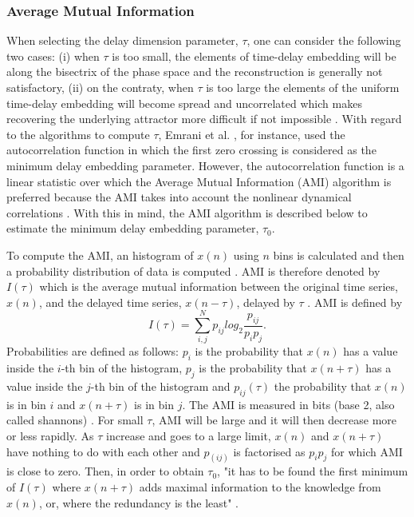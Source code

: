 \documentclass[fleqn,10pt]{wlscirep}
\begin{document}
\subsubsection*{Average Mutual Information}
When selecting the delay dimension parameter, $\tau$, one can consider the 
following two cases:
(i) when $\tau$ is too small, the elements of time-delay embedding will be along
the bisectrix of the phase space and the reconstruction is generally not 
satisfactory, 
(ii) on the contraty, when $\tau$ is too large the elements of the uniform 
time-delay embedding will become spread and uncorrelated which makes 
recovering the underlying attractor more difficult if not 
impossible \cite{casdagli1991, emrani2014a, garcia2005e71}.
With regard to the algorithms to compute $\tau$, 
Emrani et al. \cite{emrani2014a}, for instance, used the autocorrelation 
function in which the first zero crossing is considered as the minimum delay 
embedding parameter. However, the autocorrelation function is a linear 
statistic over which the Average Mutual Information (AMI) algorithm is 
preferred because the AMI takes into account the nonlinear dynamical 
correlations \cite{afraser1986,krakovska2015}. With this in mind, the AMI 
algorithm is described below to estimate the minimum delay embedding 
parameter, \texorpdfstring{$\tau_0$}{T}.

To compute the AMI, an histogram of $x(n)$ using $n$ bins is calculated
and then a probability distribution of data is computed \cite{kantz2003}.
AMI is therefore denoted by $I(\tau)$ which is the average mutual 
information between the original time series, $x(n)$, and the delayed 
time series, $x(n-\tau)$, delayed by $\tau$ \cite{kabiraj2012}. 
AMI is defined by
\begin{equation}\label{eq:ami}
I(\tau) = \sum_{i,j}^N p_{ij} log_2 \frac{ p_{ij} }{ p_i p_j }.
\end{equation}
Probabilities are defined as follows:
$p_i$ is the probability that $x(n)$ has a value inside the $i$-th bin of 
the histogram, $p_j$ is the probability that $x(n+\tau)$ has a value inside 
the $j$-th bin of the histogram and $p_{ij}(\tau)$ the probability 
that $x(n)$ is in bin $i$ and $x(n+\tau)$ is in bin $j$. The AMI is measured 
in bits (base 2, also called shannons) \cite{kantz2003, nonlinearTseries2016}.
For small $\tau$, AMI will be large and it will then decrease more or 
less rapidly. As $\tau$ increase and goes to a large limit, 
$x(n)$ and $x(n+\tau)$ have nothing to do with each other and $p_(ij)$ is 
factorised as $p_ip_j$ for which AMI is close to zero. Then, in order 
to obtain $\tau_0$, "it has to be found the first minimum of $I(\tau)$ 
where $x(n+\tau)$ adds maximal information to the knowledge from $x(n)$, or,
where the redundancy is the least" \cite{kantz2003}.
\end{document}
